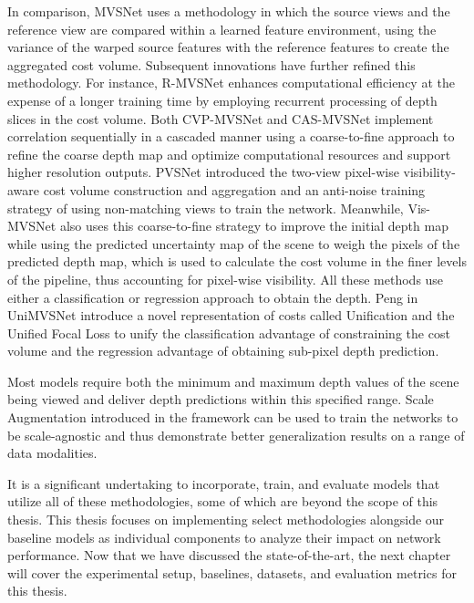 In comparison, MVSNet\cite{Yao2018} uses a methodology in which the source views and the reference view are compared within a learned feature environment, using the variance of the warped source features with the reference features to create the aggregated cost volume. Subsequent innovations have further refined this methodology. For instance, R-MVSNet\cite{Yao2019} enhances computational efficiency at the expense of a longer training time by employing recurrent processing of depth slices in the cost volume. Both CVP-MVSNet\cite{Yang2020} and CAS-MVSNet\cite{Gu2020} implement correlation sequentially in a cascaded manner using a coarse-to-fine approach to refine the coarse depth map and optimize computational resources and support higher resolution outputs. PVSNet \cite{Xu2020} introduced the two-view pixel-wise visibility-aware cost volume construction and aggregation and an anti-noise training strategy of using non-matching views to train the network. Meanwhile, Vis-MVSNet\cite{Zhang2020} also uses this coarse-to-fine strategy to improve the initial depth map while using the predicted uncertainty map of the scene to weigh the pixels of the predicted depth map, which is used to calculate the cost volume in the finer levels of the pipeline, thus accounting for pixel-wise visibility. All these methods use either a classification or regression approach to obtain the depth. Peng {\etal} in UniMVSNet \cite{peng2022rethinking} introduce a novel representation of costs called Unification and the Unified Focal Loss to unify the classification advantage of constraining the cost volume and the regression advantage of obtaining sub-pixel depth prediction. \par
Most models require both the minimum and maximum depth values of the scene being viewed and deliver depth predictions within this specified range. Scale Augmentation \cite{schroeppel2022benchmark} introduced in the {\rmvd} framework can be used to train the networks to be scale-agnostic and thus demonstrate better generalization results on a range of data modalities.\par


It is a significant undertaking to incorporate, train, and evaluate models that utilize all of these methodologies, some of which are beyond the scope of this thesis. This thesis focuses on implementing select methodologies alongside our baseline models as individual components to analyze their impact on network performance. Now that we have discussed the state-of-the-art, the next chapter will cover the experimental setup, baselines, datasets, and evaluation metrics for this thesis. 
